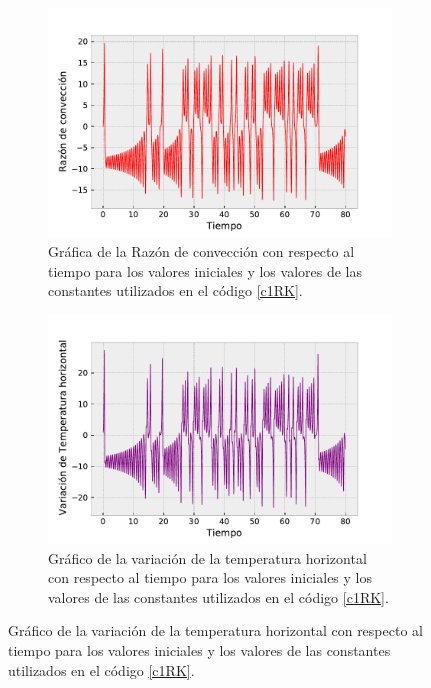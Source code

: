 \documentclass[../portafolio.tex]{subfiles}
\begin{document}
\begin{figure}[h]
    \centering
    \begin{subfigure}[b]{0.3\textwidth}
        \centering
        \includegraphics[width=\textwidth]{tex/img/ej2_RK_graf0.pdf}
        \caption{Gráfica de la Razón de convección con respecto al tiempo para los valores iniciales y los valores de las constantes utilizados en el código \ref{c1RK}.}
        \label{RKgraf1}
    \end{subfigure}
    \hfill
    \begin{subfigure}[b]{0.3\textwidth}
        \centering
        \includegraphics[width=\textwidth]{tex/img/ej2_RK_graf1.pdf}
        \caption{Gráfico de la variación de la temperatura horizontal con respecto al tiempo para los valores iniciales y los valores de las constantes utilizados en el código \ref{c1RK}.}
        \label{RKgraf2}
    \end{subfigure}

\end{figure}
\end{document}
